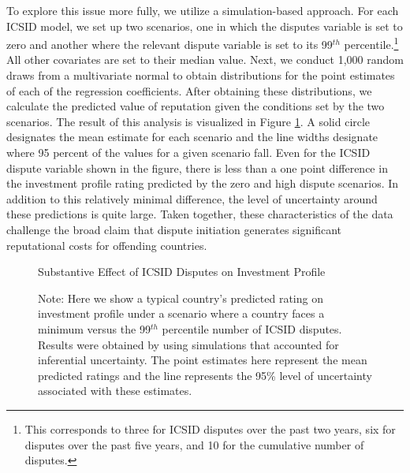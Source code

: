 \documentclass[12pt,onesided]{amsart}
\begin{document}
To explore this issue more fully, we utilize a simulation-based approach. For each ICSID model, we set up two scenarios, one in which the disputes variable is set to zero and another where the relevant dispute variable is set to its 99$^{th}$ percentile.\footnote{This corresponds to three for ICSID disputes over the past two years, six for disputes over the past five years, and 10 for the cumulative number of disputes.} All other covariates are set to their median value. Next, we conduct 1,000 random draws from a multivariate normal to obtain distributions for the point estimates of each of the regression coefficients. After obtaining these distributions, we calculate the predicted value of reputation given the conditions set by the two scenarios. The result of this analysis is visualized in Figure \ref{fig:subEffect}. A solid circle designates the mean estimate for each scenario and the line widths designate where 95 percent of the values for a given scenario fall. Even for the ICSID dispute variable shown in the figure, there is less than a one point difference in the investment profile rating predicted by the zero and high dispute scenarios. In addition to this relatively minimal difference, the level of uncertainty around these predictions is quite large. Taken together, these characteristics of the data challenge the broad claim that dispute initiation generates significant reputational costs for offending countries.

\begin{figure}[ht]
	\centering
	\caption{Substantive Effect of ICSID Disputes on Investment Profile}
	\label{fig:subEffect}
	\resizebox{1\textwidth}{!}{}
	\caption*{Note: Here we show a typical country's predicted rating on investment profile under a scenario where a country faces a minimum versus the 99$^{th}$ percentile number of ICSID disputes. Results were obtained by using simulations that accounted for inferential uncertainty. The point estimates here represent the mean predicted ratings and the line represents the 95\% level of uncertainty associated with these estimates.}
\end{figure}
\FloatBarrier


\end{document}
